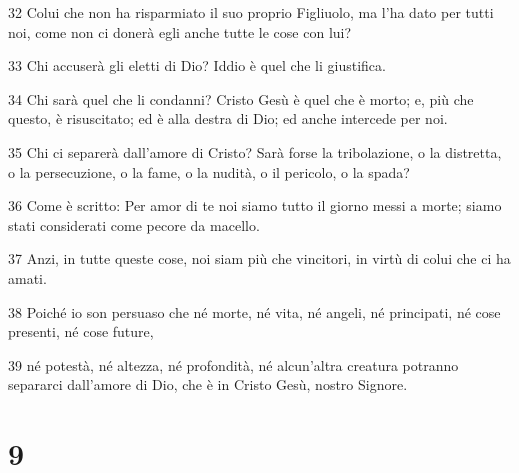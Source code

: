 \par 32 Colui che non ha risparmiato il suo proprio Figliuolo, ma l'ha dato per tutti noi, come non ci donerà egli anche tutte le cose con lui?
\par 33 Chi accuserà gli eletti di Dio? Iddio è quel che li giustifica.
\par 34 Chi sarà quel che li condanni? Cristo Gesù è quel che è morto; e, più che questo, è risuscitato; ed è alla destra di Dio; ed anche intercede per noi.
\par 35 Chi ci separerà dall'amore di Cristo? Sarà forse la tribolazione, o la distretta, o la persecuzione, o la fame, o la nudità, o il pericolo, o la spada?
\par 36 Come è scritto: Per amor di te noi siamo tutto il giorno messi a morte; siamo stati considerati come pecore da macello.
\par 37 Anzi, in tutte queste cose, noi siam più che vincitori, in virtù di colui che ci ha amati.
\par 38 Poiché io son persuaso che né morte, né vita, né angeli, né principati, né cose presenti, né cose future,
\par 39 né potestà, né altezza, né profondità, né alcun'altra creatura potranno separarci dall'amore di Dio, che è in Cristo Gesù, nostro Signore.

\chapter{9}

